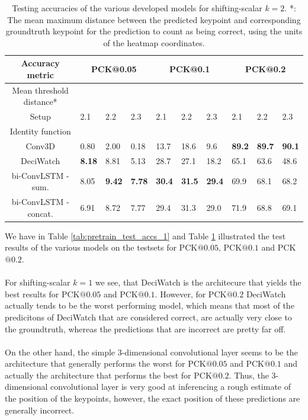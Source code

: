 \documentclass[./main.tex]{subfiles}
\begin{document}
\begin{table}[htbp]
    \begin{tabular}{c||lll|lll|lll}
        \hline
        Accuracy metric & \multicolumn{3}{c}{PCK@0.05} & \multicolumn{3}{c}{PCK@0.1} & \multicolumn{3}{c}{PCK@0.2} \\
        \hline
        Mean threshold distance* & \multicolumn{3}{c}{} & \multicolumn{3}{c}{} & \multicolumn{3}{c}{} \\
        \hline
        Setup & 2.1 & 2.2 & 2.3 & 2.1 & 2.2 & 2.3 & 2.1 & 2.2 & 2.3 \\
        \hline
        \hline
        Identity function & & & & & & & & & \\
        Conv3D & 0.80 & 2.00 & 0.18 & 13.7 & 18.6 & 9.6 & \textbf{89.2} & \textbf{89.7} & \textbf{90.1} \\
        DeciWatch & \textbf{8.18} & 8.81 & 5.13 & 28.7 & 27.1 & 18.2 & 65.1 & 63.6 & 48.6 \\
        bi-ConvLSTM - sum. & 8.05 & \textbf{9.42} & \textbf{7.78} & \textbf{30.4} & \textbf{31.5} & \textbf{29.4} & 69.9 & 68.1 & 68.2 \\
        bi-ConvLSTM - concat. & 6.91 & 8.72 & 7.77 & 29.4 & 31.3 & 29.0 & 71.9 & 68.8 & 69.1 \\
        \hline
    \end{tabular}
    \caption{Testing accuracies of the various developed models for shifting-scalar $k = 2$. *: The mean maximum distance between the predicted keypoint and corresponding groundtruth keypoint for the prediction to count as being correct, using the units of the heatmap coordinates.}
    \label{tab:pretrain_test_accs_2}
\end{table}
\noindent We have in Table \ref{tab:pretrain_test_accs_1} and Table \ref{tab:pretrain_test_accs_2} illustrated the test results of the various models on the testsets for PCK$@0.05$, PCK$@0.1$ and PCK$@0.2$.
\\
\\
For shifting-scalar $k = 1$ we see, that DeciWatch is the architecure that yields the best results for PCK$@0.05$ and PCK$@0.1$. However, for PCK$@0.2$ DeciWatch actually tends to be the worst performing model, which means that most of the predicitons of DeciWatch that are considered correct, are actually very close to the groundtruth, whereas the predictions that are incorrect are pretty far off.
\\
\\
On the other hand, the simple 3-dimensional convolutional layer seems to be the architecture that generally performs the worst for PCK$@0.05$ and PCK$@0.1$ and actually the architecture that performs the best for PCK$@0.2$. Thus, the 3-dimensional convolutional layer is very good at inferencing a rough estimate of the position of the keypoints, however, the exact position of these predictions are generally incorrect.
\end{document}
